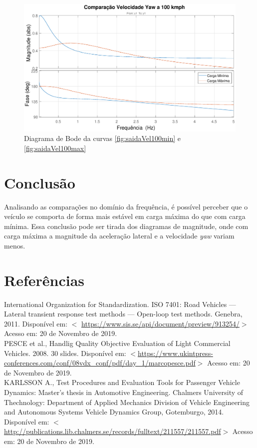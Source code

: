 \documentclass[a4paper, 12pt]{article}
\begin{document}
\begin{figure}[H]
\centering
\includegraphics[width=13cm]{imagens/yaw100.eps}
\caption{Diagrama de Bode da curvas \ref{fig:saidaVel100min} e \ref{fig:saidaVel100max}}
\label{graf:sweep_sine}
\end{figure}



\section{Conclusão}

Analisando as comparações no domínio da frequência, é possível perceber que o veículo se comporta de forma mais estável em carga máxima do que com carga mínima. Essa conclusão pode ser tirada dos diagramas de magnitude, onde com carga máxima a magnitude da aceleração lateral e a velocidade \textit{yaw} variam menos.


\section{Referências}
{\noindent
International Organization for Standardization. ISO 7401: Road Vehicles --- Lateral transient response test methods --- Open-loop test methods. Genebra, 2011. 
Disponível em: $<$ \url{https://www.sis.se/api/document/preview/913254/}$>$ Acesso em: 20 de Novembro de 2019.\vspace{0.5cm}
\\
PESCE et al., Handlig Quality Objective Evaluation of Light Commercial Vehicles. 2008. 30 slides. Disponível em: $<$\url{https://www.ukintpress-conferences.com/conf/08vdx_conf/pdf/day_1/marcopesce.pdf}$>$ Acesso em: 20 de Novembro de 2019. \vspace{0.5cm}
    \\
    KARLSSON A., Test Procedures and Evaluation Tools for Passenger Vehicle Dynamics: Master’s thesis in Automotive Engineering. Chalmers University of Thechnology: Department of Applied Mechanics Division of Vehicle Engineering and Autonomous Systems Vehicle Dynamics Group, Gotemburgo, 2014. Disponível em: $<$\url{http://publications.lib.chalmers.se/records/fulltext/211557/211557.pdf}$>$ Acesso em: 20 de Novembro de 2019.
    }
\end{document}
